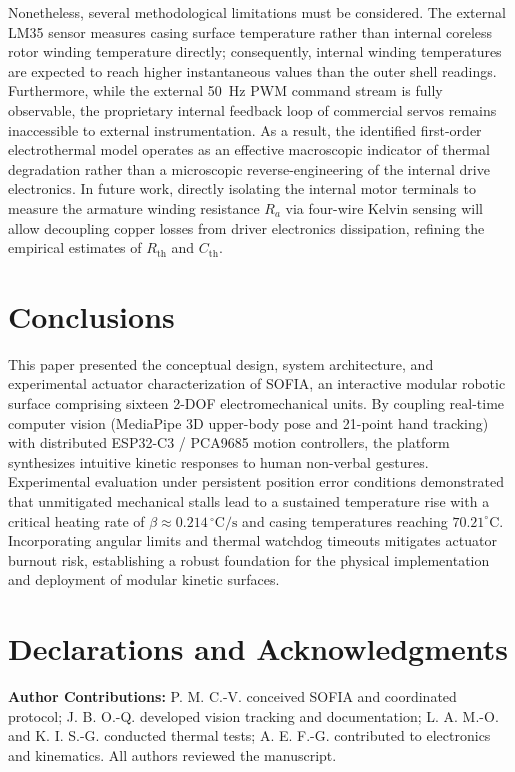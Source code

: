 \documentclass[lettersize,journal]{IEEEtran}
\begin{document}
	Nonetheless, several methodological limitations must be considered. The external LM35 sensor measures casing surface temperature rather than internal coreless rotor winding temperature directly; consequently, internal winding temperatures are expected to reach higher instantaneous values than the outer shell readings. Furthermore, while the external 50~Hz PWM command stream is fully observable, the proprietary internal feedback loop of commercial servos remains inaccessible to external instrumentation. As a result, the identified first-order electrothermal model operates as an effective macroscopic indicator of thermal degradation rather than a microscopic reverse-engineering of the internal drive electronics. In future work, directly isolating the internal motor terminals to measure the armature winding resistance $R_a$ via four-wire Kelvin sensing will allow decoupling copper losses from driver electronics dissipation, refining the empirical estimates of $R_{\text{th}}$ and $C_{\text{th}}$.
	
	\newpage
	
	\section{Conclusions}
	\label{sec:conclusions}
	
	This paper presented the conceptual design, system architecture, and experimental actuator characterization of SOFIA, an interactive modular robotic surface comprising sixteen 2-DOF electromechanical units. By coupling real-time computer vision (MediaPipe 3D upper-body pose and 21-point hand tracking) with distributed ESP32-C3 / PCA9685 motion controllers, the platform synthesizes intuitive kinetic responses to human non-verbal gestures. Experimental evaluation under persistent position error conditions demonstrated that unmitigated mechanical stalls lead to a sustained temperature rise with a critical heating rate of $\beta \approx 0.214\,^\circ\text{C/s}$ and casing temperatures reaching $70.21^\circ\text{C}$. Incorporating angular limits and thermal watchdog timeouts mitigates actuator burnout risk, establishing a robust foundation for the physical implementation and deployment of modular kinetic surfaces.
	
	
	\section*{Declarations and Acknowledgments}
	\footnotesize
	\textbf{Author Contributions:} P. M. C.-V. conceived SOFIA and coordinated protocol; J. B. O.-Q. developed vision tracking and documentation; L. A. M.-O. and K. I. S.-G. conducted thermal tests; A. E. F.-G. contributed to electronics and kinematics. All authors reviewed the manuscript.
	
\end{document}
